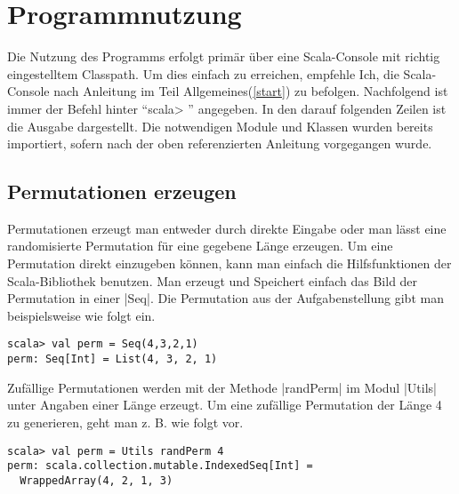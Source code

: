 \section{Programmnutzung}
\lstset{basicstyle=\ttfamily}
Die Nutzung des Programms erfolgt primär über eine Scala-Console mit richtig eingestelltem Classpath.
Um dies einfach zu erreichen, empfehle Ich, die Scala-Console nach Anleitung im Teil Allgemeines(\ref{start}) zu befolgen.
Nachfolgend ist immer der Befehl hinter ``scala> '' angegeben. In den darauf folgenden Zeilen ist die Ausgabe dargestellt.
Die notwendigen Module und Klassen wurden bereits importiert, sofern nach der oben referenzierten Anleitung vorgegangen wurde.
\subsection{Permutationen erzeugen}
Permutationen erzeugt man entweder durch direkte Eingabe oder man lässt eine randomisierte Permutation für eine gegebene Länge erzeugen.
Um eine Permutation direkt einzugeben können, kann man einfach die Hilfsfunktionen der Scala-Bibliothek benutzen.
Man erzeugt und Speichert einfach das Bild der Permutation in einer |Seq|. Die Permutation aus der Aufgabenstellung gibt man beispielsweise wie folgt ein.
\begin{lstlisting}
scala> val perm = Seq(4,3,2,1)
perm: Seq[Int] = List(4, 3, 2, 1)  
\end{lstlisting}
Zufällige Permutationen werden mit der Methode |randPerm| im Modul |Utils| unter Angaben einer Länge erzeugt.
Um eine zufällige Permutation der Länge 4 zu generieren, geht man z. B. wie folgt vor.
\begin{lstlisting}
scala> val perm = Utils randPerm 4                                                                                                 
perm: scala.collection.mutable.IndexedSeq[Int] =
  WrappedArray(4, 2, 1, 3)  
\end{lstlisting}
